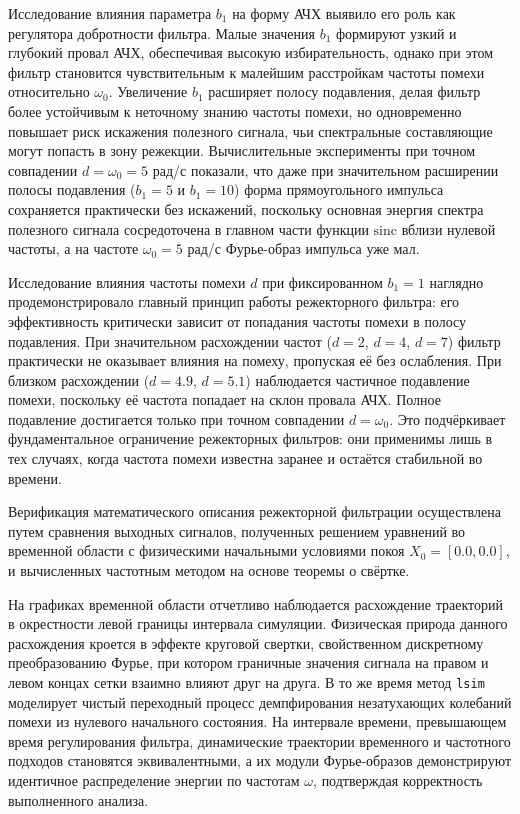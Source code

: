 Исследование влияния параметра $b_1$ на форму АЧХ выявило его роль как регулятора добротности фильтра. Малые значения $b_1$ формируют узкий и глубокий провал АЧХ, обеспечивая высокую избирательность, однако при этом фильтр становится чувствительным к малейшим расстройкам частоты помехи относительно $\omega_0$. Увеличение $b_1$ расширяет полосу подавления, делая фильтр более устойчивым к неточному знанию частоты помехи, но одновременно повышает риск искажения полезного сигнала, чьи спектральные составляющие могут попасть в зону режекции. Вычислительные эксперименты при точном совпадении $d = \omega_0 = 5$ рад/с показали, что даже при значительном расширении полосы подавления ($b_1 = 5$ и $b_1 = 10$) форма прямоугольного импульса сохраняется практически без искажений, поскольку основная энергия спектра полезного сигнала сосредоточена в главном части функции $\text{sinc}$ вблизи нулевой частоты, а на частоте $\omega_0 = 5$ рад/с Фурье-образ импульса уже мал.

Исследование влияния частоты помехи $d$ при фиксированном $b_1 = 1$ наглядно продемонстрировало главный принцип работы режекторного фильтра: его эффективность критически зависит от попадания частоты помехи в полосу подавления. При значительном расхождении частот ($d = 2$, $d = 4$, $d = 7$) фильтр практически не оказывает влияния на помеху, пропуская её без ослабления. При близком расхождении ($d = 4.9$, $d = 5.1$) наблюдается частичное подавление помехи, поскольку её частота попадает на склон провала АЧХ. Полное подавление достигается только при точном совпадении $d = \omega_0$. Это подчёркивает фундаментальное ограничение режекторных фильтров: они применимы лишь в тех случаях, когда частота помехи известна заранее и остаётся стабильной во времени.

Верификация математического описания режекторной фильтрации осуществлена путем сравнения выходных сигналов, полученных решением уравнений во временной области с физическими начальными условиями покоя $X_0 = [0.0, 0.0]$, и вычисленных частотным методом на основе теоремы о свёртке.

На графиках временной области отчетливо наблюдается расхождение траекторий в окрестности левой границы интервала симуляции. Физическая природа данного расхождения кроется в эффекте круговой свертки, свойственном дискретному преобразованию Фурье, при котором граничные значения сигнала на правом и левом концах сетки взаимно влияют друг на друга. В то же время метод \texttt{lsim} моделирует чистый переходный процесс демпфирования незатухающих колебаний помехи из нулевого начального состояния. На интервале времени, превышающем время регулирования фильтра, динамические траектории временного и частотного подходов становятся эквивалентными, а их модули Фурье-образов демонстрируют идентичное распределение энергии по частотам $\omega$, подтверждая корректность выполненного анализа.